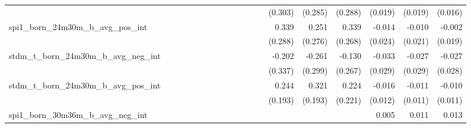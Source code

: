 \begin{tabular}{lrrrrrrrrrrrrrrrrrr}
                                            &              &              &              &              &              &              &              &              &               &              &              &               &      (0.303) &      (0.285) &       (0.288) &      (0.019) &      (0.019) &       (0.016) \\ 
spi1\_born\_24m30m\_b\_avg\_pos\_int        &              &              &              &              &              &              &              &              &               &              &              &               &        0.339 &        0.251 &         0.339 &       -0.014 &       -0.010 &        -0.002 \\ 
                                            &              &              &              &              &              &              &              &              &               &              &              &               &      (0.288) &      (0.276) &       (0.268) &      (0.024) &      (0.021) &       (0.019) \\ 
stdm\_t\_born\_24m30m\_b\_avg\_neg\_int     &              &              &              &              &              &              &              &              &               &              &              &               &       -0.202 &       -0.261 &        -0.130 &       -0.033 &       -0.027 &        -0.027 \\ 
                                            &              &              &              &              &              &              &              &              &               &              &              &               &      (0.337) &      (0.299) &       (0.267) &      (0.029) &      (0.029) &       (0.028) \\ 
stdm\_t\_born\_24m30m\_b\_avg\_pos\_int     &              &              &              &              &              &              &              &              &               &              &              &               &        0.244 &        0.321 &         0.224 &       -0.016 &       -0.011 &        -0.010 \\ 
                                            &              &              &              &              &              &              &              &              &               &              &              &               &      (0.193) &      (0.193) &       (0.221) &      (0.012) &      (0.011) &       (0.011) \\ 
spi1\_born\_30m36m\_b\_avg\_neg\_int        &              &              &              &              &              &              &              &              &               &              &              &               &              &              &               &        0.005 &        0.011 &         0.013 \\ 

\end{tabular}
